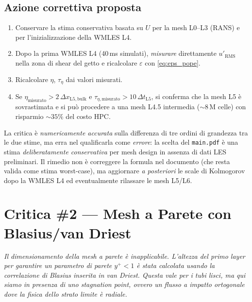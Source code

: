 \documentclass[11pt,a4paper]{article}
\begin{document}
\subsection{Azione correttiva proposta}

\begin{infobox}
\begin{enumerate}
  \item Conservare la stima conservativa basata su $U$ per la mesh
    L0--L3 (RANS) e per l'inizializzazione della WMLES L4.
  \item Dopo la prima WMLES L4 (40\,ms simulati), \emph{misurare}
    direttamente $u'_{\mathrm{RMS}}$ nella zona di shear del getto e
    ricalcolare $\varepsilon$ con \eqref{eq:eps_pope}.
  \item Ricalcolare $\eta$, $\tau_{\eta}$ dai valori misurati.
  \item Se $\eta_{\mathrm{misurato}} > 2\,\Delta x_{\mathrm{L5,bulk}}$
    e $\tau_{\eta,\mathrm{misurato}} > 10\,\Delta t_{\mathrm{L5}}$,
    si conferma che la mesh L5 è sovrastimata e si può procedere a
    una mesh L4.5 intermedia ($\sim 8$\,M celle) con risparmio
    $\sim 35\%$ del costo HPC.
\end{enumerate}
\end{infobox}

\begin{verdettoparz}
La critica è \emph{numericamente accurata} sulla differenza di tre
ordini di grandezza tra le due stime, ma erra nel qualificarla come
\emph{errore}: la scelta del \texttt{main.pdf} è una stima
\emph{deliberatamente conservativa} per mesh design in assenza di
dati LES preliminari. Il rimedio non è correggere la formula nel
documento (che resta valida come stima worst-case), ma aggiornare
\emph{a posteriori} le scale di Kolmogorov dopo la WMLES L4 ed
eventualmente rilassare le mesh L5/L6.
\end{verdettoparz}

\section{Critica \#2 — Mesh a Parete con Blasius/van Driest}
\label{sec:c2}

\begin{citazione}
\textit{Il dimensionamento della mesh a parete è inapplicabile.
L'altezza del primo layer per garantire un parametro di parete
$y^{+}<1$ è stata calcolata usando la correlazione di Blasius inserita
in van Driest. Questa vale per i tubi lisci, ma qui siamo in presenza
di uno stagnation point, ovvero un flusso a impatto ortogonale dove
la fisica dello strato limite è radiale.}
\end{citazione}
\end{document}
